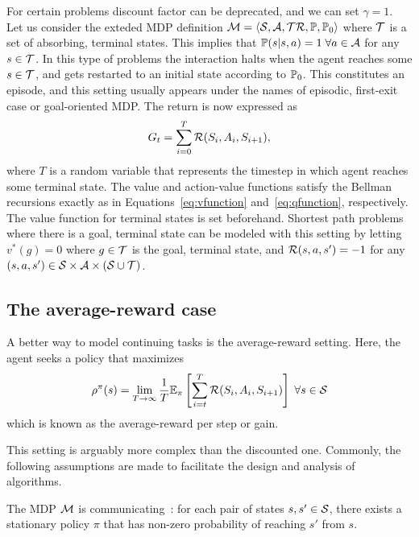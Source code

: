 \begin{example}
  For certain problems discount factor can be deprecated, and we can set $\gamma=1$. Let us consider the exteded MDP definition $\mathcal{M}=\langle\mathcal{S},\mathcal{A},\mathcal{T}\mathcal{R},\mathbb{P},\mathbb{P}_0\rangle$ where $\mathcal{T}$ is a set of absorbing, terminal states. This implies that $\mathbb{P}(s\lvert s, a) = 1\;\forall a\in\mathcal{A}$ for any $s\in\mathcal{T}$. In this type of problems the interaction halts when the agent reaches some $s\in\mathcal{T}$, and gets restarted to an initial state according to $\mathbb{P}_0$. This constitutes an episode, and this setting usually appears under the names of episodic, first-exit case or goal-oriented MDP. The return is now expressed as
  \begin{equation*}
    G_t = \sum_{i=0}^T \mathcal{R}(S_i, A_i, S_{i+1}),
  \end{equation*}
  where $T$ is a random variable that represents the timestep in which agent reaches some terminal state. The value and action-value functions satisfy the Bellman recursions exactly as in Equations~\eqref{eq:vfunction} and~\eqref{eq:qfunction}, respectively. The value function for terminal states is set beforehand. Shortest path problems where there is a goal, terminal state can be modeled with this setting by letting $v^*(g)=0$ where $g\in\mathcal{T}$ is the goal, terminal state, and $\linebreak\cR(s, a, s')=-1$ for any $(s,a,s')\in\mathcal{S}\times\mathcal{A}\times(\mathcal{S}\cup\mathcal{T})$.
\end{example}
\subsection{The average-reward case}
A better way to model continuing tasks is the average-reward setting. Here, the agent seeks a policy that maximizes 
\begin{equation}
  \rho^\pi(s) =\lim_{T\rightarrow\infty}\frac 1 T \mathbb{E}_\pi\left[\sum_{i=t}^T\mathcal{R}(S_i, A_i, S_{i+1})\right] \;\forall s\in\mathcal{S}
\end{equation}
which is known as the average-reward per step or gain.

This setting is arguably more complex than the discounted one. Commonly, the following assumptions are made to facilitate the design and analysis of algorithms.
\begin{assumption}
  The MDP $\mathcal{M}$ is communicating~\citep{Puterman1994}: for each pair of states $s,s'\in\mathcal{S}$, there exists a stationary policy $\pi$ that has non-zero probability of reaching $s'$ from $s$.
  \label{ass:mdp_communicating}
\end{assumption}

